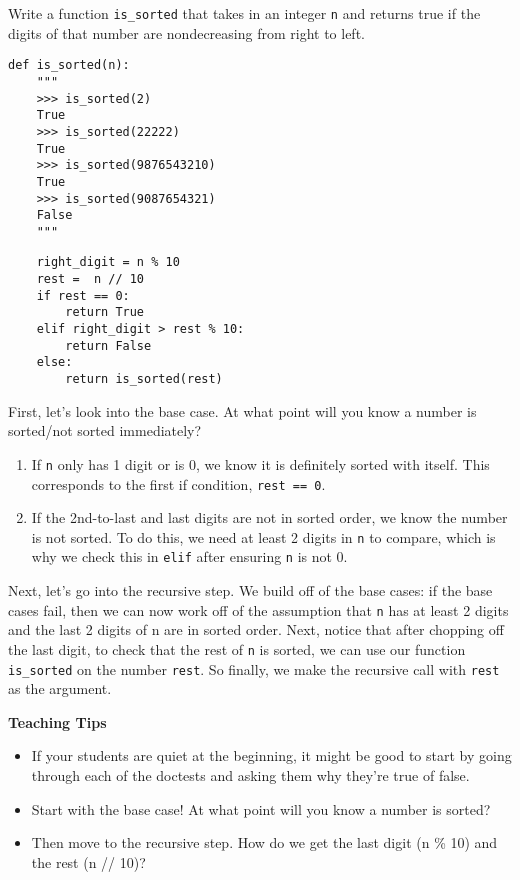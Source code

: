 \begin{blocksection}
\question Write a function \lstinline$is_sorted$ that takes in an integer
\lstinline$n$ and returns true if the digits of that number are nondecreasing from
right to left.

\begin{lstlisting}
def is_sorted(n):
    """
    >>> is_sorted(2)
    True
    >>> is_sorted(22222)
    True
    >>> is_sorted(9876543210)
    True
    >>> is_sorted(9087654321)
    False
    """
\end{lstlisting}
\end{blocksection}

\begin{solution}[1in]
\begin{blocksection}
\begin{lstlisting}
    right_digit = n % 10
    rest =  n // 10
    if rest == 0:
        return True
    elif right_digit > rest % 10:
        return False
    else:
        return is_sorted(rest)
\end{lstlisting}

First, let’s look into the base case. At what point will you know a number is sorted/not sorted immediately?
\begin{enumerate}
\item If \lstinline{n} only has 1 digit or is 0, we know it is definitely sorted with itself. This corresponds to the first if condition, \lstinline{rest == 0}.
\item If the 2nd-to-last and last digits are not in sorted order, we know the number is not sorted. To do this, we need at least 2 digits in \lstinline{n} to compare, which is why we check this in \lstinline{elif} after ensuring \lstinline{n} is not 0.
\end{enumerate}

Next, let’s go into the recursive step. We build off of the base cases: if the base cases fail, then we can now work off of the assumption that \lstinline{n} has at least 2 digits and the last 2 digits of n are in sorted order. Next, notice that after chopping off the last digit, to check that the rest of \lstinline{n} is sorted, we can use our function \lstinline{is_sorted} on the number \lstinline{rest}. So finally, we make the recursive call with \lstinline{rest} as the argument.
\end{blocksection}
\end{solution}

\begin{guide}
\begin{blocksection}
  \textbf{Teaching Tips}
  \begin{itemize}
      \item If your students are quiet at the beginning, it might be good to start by going through each of the doctests and asking them why they're true of false.
      \item Start with the base case! At what point will you know a number is sorted?
      \item Then move to the recursive step. How do we get the last digit (n \% 10) and the rest (n // 10)?
  \end{itemize}
\end{blocksection}
\end{guide}
